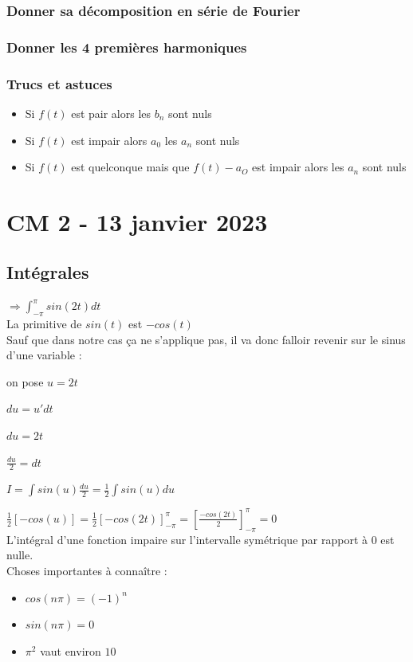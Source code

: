\documentclass[12pt, a4paper]{article}
\begin{document}
\subsubsection{Donner sa décomposition en série de Fourier}

\subsubsection{Donner les 4 premières harmoniques}

\subsubsection{Trucs et astuces}

\begin{itemize}
    \item Si $ f(t) $ est pair alors les $ b_{n} $ sont nuls
    \item Si $ f(t) $ est impair alors $ a_{0} $ les $ a_{n} $ sont nuls
    \item Si $ f(t) $ est quelconque mais que $ f(t) - a_{O} $ est impair alors les
    $ a_{n} $ sont nuls 
\end{itemize}

\newpage

\section{CM 2 - 13 janvier 2023}
\subsection{Intégrales}
\par $ \Rightarrow \int_{- \pi}^{\pi}  sin(2t)dt $\\

La primitive de $ sin(t) $ est $ -cos(t) $\\

Sauf que dans notre cas ça ne s'applique pas, il va donc falloir revenir sur le
sinus d'une variable :

on pose $ u = 2t $ \\
\par $ du = u' dt $ \\
\par $ du = 2t $ \\
\par $ \frac{du}{2} = dt $ \\
\par $ I = \int sin(u)\frac{du}{2} = \frac{1}{2}\int sin(u) du $ \\
\par $ \frac{1}{2} [-cos(u)] = \frac{1}{2}[-cos(2t)]_{-\pi}^{\pi} = [\frac{-cos(2t)}{2}]_{-\pi}^{\pi} = 0 $ \\  

L'intégral d'une fonction impaire sur l'intervalle symétrique par rapport à 0 est nulle.\\

Choses importantes à connaître : \\
\begin{itemize}
    \item $ cos(n\pi) = (-1)^{n} $\\
    \item $ sin(n\pi) = 0 $\\
    \item $ \pi^{2} $ vaut environ $ 10 $\\
    
\end{itemize}
\end{document}
